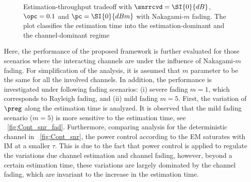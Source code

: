 {\begin{figure}[!ht]
\vspace{-2mm}
\caption{Estimation-throughput tradeoff with $\snrrcvd = \SI{0}{dB}$, $\opc = 0.1$ and $\pc = \SI{0}{dBm}$ with Nakagami-$m$ fading. The plot classifies the estimation time into the estimation-dominant and the channel-dominant regime}
\label{fig:ETT_fad}
\end{figure}

Here, the performance of the proposed framework is further evaluated for those scenarios where the interacting channels are under the influence of Nakagami-$m$ fading. For simplification of the analysis, it is assumed that $m$ parameter to be the same for all the involved channels. In addition, the performance is investigated under following fading scenarios: (i) severe fading $m=1$, which corresponds to Rayleigh fading, and (ii) mild fading $m = 5$. First, the variation of $\preg$ along the estimation time is analyzed. It is observed that the mild fading scenario ($m = 5$) is more sensitive to the estimation time, see \figurename~\ref{fig:Cont_snr_fad}. Furthermore, comparing analysis for the deterministic channel in \figurename~\ref{fig:Cont_snr}, the power control according to the EM saturates with IM at a smaller $\tau$. This is due to the fact that power control is applied to regulate the variations due channel estimation and channel fading, however, beyond a certain estimation time, these variations are largely dominated by the channel fading, which are invariant to the increase in the estimation time. 

}
